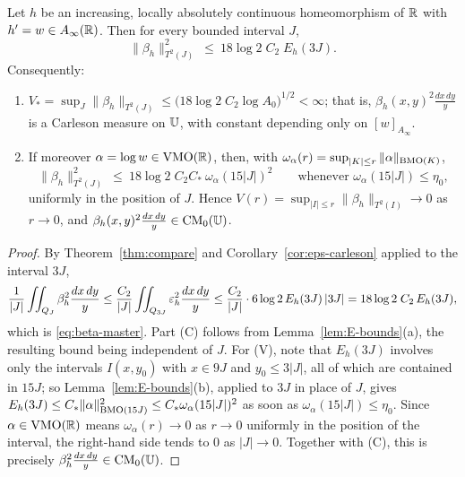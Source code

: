 \begin{theorem}\label{thm:beta-carleson}
	Let $h$ be an increasing, locally absolutely continuous homeomorphism of $\mathbb{R}$
	with $h'=w\in A_\infty(\mathbb{R})$. Then for every bounded interval $J$,
	\begin{equation}\label{eq:beta-master}
		\|\beta_h\|_{T^2(J)}^2\ \le\ 18\log2\;C_2\;E_h(3J).
	\end{equation}
	Consequently:
	\begin{enumerate}
		\item[\rm(C)] $\displaystyle V_*=\sup_J\|\beta_h\|_{T^2(J)}
		\le\bigl(18\log2\;C_2\log A_0\bigr)^{1/2}<\infty$; that is,
		$\beta_h(x,y)^2\frac{dx\,dy}{y}$ is a Carleson measure on $\mathbb{U}$, with constant
		depending only on $[w]_{A_\infty}$.
		\item[\rm(V)] If moreover $\alpha=\log w\in\mathrm{VMO}(\mathbb{R})$, then, with
		$\omega_\alpha(r)=\sup_{|K|\le r}\|\alpha\|_{\mathrm{BMO}(K)}$,
		\[
		\|\beta_h\|_{T^2(J)}^2\ \le\ 18\log2\;C_2C_\ast\ \omega_\alpha(15|J|)^2
		\qquad\text{whenever }\omega_\alpha(15|J|)\le\eta_0,
		\]
		uniformly in the position of $J$. Hence
		$V(r)=\sup_{|I|\le r}\|\beta_h\|_{T^2(I)}\to0$ as $r\to0$, and
		$\beta_h(x,y)^2\frac{dx\,dy}{y}\in\mathrm{CM}_0(\mathbb{U})$.
	\end{enumerate}
\end{theorem}

\begin{proof}
	By Theorem~\ref{thm:compare} and Corollary~\ref{cor:eps-carleson} applied to
	the interval $3J$,
	\[
	\frac1{|J|}\iint_{Q_J}\beta_h^2\frac{dx\,dy}{y}
	\le\frac{C_2}{|J|}\iint_{Q_{3J}}\varepsilon_h^2\frac{dx\,dy}{y}
	\le\frac{C_2}{|J|}\cdot6\log2\,E_h(3J)\,|3J|
	=18\log2\;C_2\,E_h(3J),
	\]
	which is \eqref{eq:beta-master}. Part (C) follows from
	Lemma~\ref{lem:E-bounds}(a), the resulting bound being independent of $J$. For
	(V), note that $E_h(3J)$ involves only the intervals $I(x,y_0)$ with $x\in9J$
	and $y_0\le3|J|$, all of which are contained in $15J$; so
	Lemma~\ref{lem:E-bounds}(b), applied to $3J$ in place of $J$, gives
	$E_h(3J)\le C_\ast\|\alpha\|^2_{\mathrm{BMO}(15J)}\le C_\ast\omega_\alpha(15|J|)^2$ as
	soon as $\omega_\alpha(15|J|)\le\eta_0$. Since $\alpha\in\mathrm{VMO}(\mathbb{R})$ means
	$\omega_\alpha(r)\to0$ as $r\to0$ uniformly in the position of the interval,
	the right-hand side tends to $0$ as $|J|\to0$. Together with (C), this is
	precisely $\beta_h^2\frac{dx\,dy}{y}\in\mathrm{CM}_0(\mathbb{U})$.
\end{proof}


